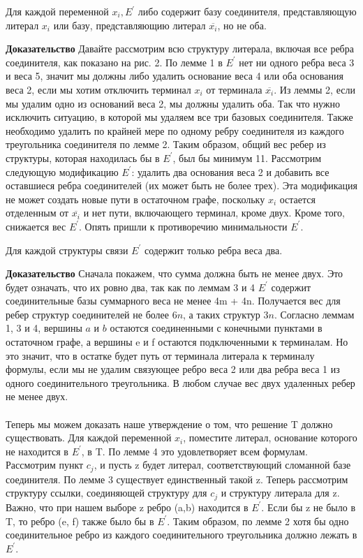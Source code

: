 \begin{lemma} Для каждой переменной \(x_i,E^'\) либо содержит базу соединителя, представляющую литерал \(x_i\) или базу, представляющию литерал \(\overline{x_i}\), но не оба.
\end{lemma}
\textbf{Доказательство} Давайте рассмотрим всю структуру литерала, включая все ребра соединителя, как показано на рис. 2. По лемме 1 в \(E^'\) нет ни одного ребра веса 3 и веса 5, значит мы должны либо удалить основание веса 4 или оба основания веса 2, если мы хотим отключить терминал \(x_i\) от терминала \(\overline{x_i}\). Из леммы 2, если мы удалим одно из оснований веса 2, мы должны удалить оба. Так что нужно исключить ситуацию, в которой мы удаляем все три базовых соединителя. Также необходимо удалить по крайней мере по одному ребру соединителя из каждого треугольника соединителя по лемме 2. Таким образом, общий вес ребер из структуры, которая находилась бы в \(E^'\), был бы минимум 11. Рассмотрим следующую модификацию \(E^'\): удалить два основания веса 2 и добавить все оставшиеся ребра соединителей (их может быть не более трех). Эта модификация не может создать новые пути в остаточном графе, поскольку \(x_i\) остается отделенным от \(\overline{x_i}\) и нет пути, включающего терминал, кроме двух. Кроме того, снижается вес \(E^'\). Опять пришли к противоречию минимальности \(E^'\).
\begin{lemma} Для каждой структуры связи \(E^'\) содержит только ребра веса два.
\end{lemma}
\textbf{Доказательство} Сначала покажем, что сумма должна быть не менее двух. Это будет означать, что их ровно два, так как по леммам 3 и 4 \(E^'\) содержит соединительные базы суммарного веса не менее 4m + 4n. Получается вес для ребер структур соединителей не более \(6n\), а таких структур \(3n\). Согласно леммам 1, 3 и 4, вершины \(a\) и \(b\) остаются соединенными с конечными пунктами в остаточном графе, а вершины e и
f остаются подключенными к терминалам. Но это значит, что в остатке будет путь от терминала литерала к терминалу формулы, если мы не удалим связующее ребро веса 2 или два ребра веса 1 из одного соединительного треугольника. В любом случае вес двух удаленных ребер не менее двух.
\\\\Теперь мы можем доказать наше утверждение о том, что решение T должно существовать. Для каждой переменной \(x_i\), поместите литерал, основание которого не находится в \(E^'\), в T. По лемме 4 это удовлетворяет всем формулам. Рассмотрим пункт \(c_j\), и пусть z будет литерал, соответствующий сломанной базе соединителя. По лемме 3 существует единственный такой z. Теперь рассмотрим структуру ссылки, соединяющей структуру для \(c_j\) и структуру литерала для z. Важно, что при нашем выборе z ребро (a,b) находится в \(E^'\). Если бы z не было в T, то ребро (e, f) также было бы в \(E^'\). Таким образом, по лемме 2 хотя бы одно соединительное ребро из каждого соединительного треугольника должно лежать в \(E^'\).
